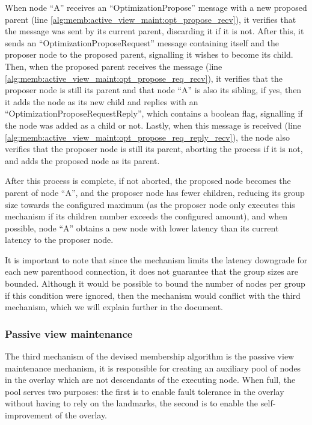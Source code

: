 When node ``A'' receives an ``OptimizationPropose'' message with a new proposed parent (line \ref{alg:memb:active_view_maint:opt_propose_recv}), it verifies that the message was sent by its current parent, discarding it if it is not. After this, it sends an ``OptimizationProposeRequest'' message containing itself and the proposer node to the proposed parent, signalling it wishes to become its child. Then, when the proposed parent receives the message (line \ref{alg:memb:active_view_maint:opt_propose_req_recv}), it verifies that the proposer node is still its parent and that node ``A'' is also its sibling, if yes, then it adds the node as its new child and replies with an ``OptimizationProposeRequestReply'', which contains a boolean flag, signalling if the node was added as a child or not. Lastly, when this message is received (line \ref{alg:memb:active_view_maint:opt_propose_req_reply_recv}), the node also verifies that the proposer node is still its parent, aborting the process if it is not, and adds the proposed node as its parent.

After this process is complete, if not aborted, the proposed node becomes the parent of node ``A'', and the proposer node has fewer children, reducing its group size towards the configured maximum (as the proposer node only executes this mechanism if its children number exceeds the configured amount), and when possible, node ``A'' obtains a new node with lower latency than its current latency to the proposer node.

It is important to note that since the mechanism limits the latency downgrade for each new parenthood connection, it does not guarantee that the group sizes are bounded. Although it would be possible to bound the number of nodes per group if this condition were ignored, then the mechanism would conflict with the third mechanism, which we will explain further in the document. 

\subsubsection{Passive view maintenance}

The third mechanism of the devised membership algorithm is the passive view maintenance mechanism, it is responsible for creating an auxiliary pool of nodes in the overlay which are not descendants of the executing node. When full, the pool serves two purposes: the first is to enable fault tolerance in the overlay without having to rely on the landmarks, the second is to enable the self-improvement of the overlay. 

